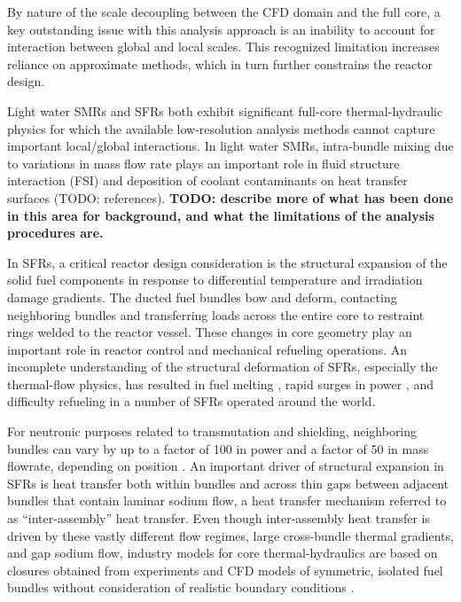 By nature of the scale decoupling between the CFD domain and the full core, a key outstanding issue with this analysis approach is an inability to account for interaction between global and local scales. This recognized limitation increases reliance on approximate methods, which in turn further constrains the reactor design.

Light water SMRs and SFRs both exhibit significant full-core thermal-hydraulic physics for which the available low-resolution analysis methods cannot capture important local/global interactions. In light water SMRs, intra-bundle mixing due to variations in mass flow rate plays an important role in fluid structure interaction (FSI) and deposition of coolant contaminants on heat transfer surfaces (TODO: references). {\bf TODO: describe more of what has been done in this area for background, and what the limitations of the analysis procedures are.}

In SFRs, a critical reactor design consideration is the structural expansion of the solid fuel components in response to differential temperature and irradiation damage gradients. The ducted fuel bundles bow and deform, contacting neighboring bundles and transferring loads across the entire core to restraint rings welded to the reactor vessel. These changes in core geometry play an important role in reactor control and mechanical refueling operations. An incomplete understanding of the structural deformation of SFRs, especially the thermal-flow physics, has resulted in fuel melting \cite{brittan}, rapid surges in power \cite{chaumont}, and difficulty refueling \cite{shields} in a number of SFRs operated around the world.

For neutronic purposes related to transmutation and shielding, neighboring bundles can vary by up to a factor of 100 in power and a factor of 50 in mass flowrate, depending on position \cite{abr}. An important driver of structural expansion in SFRs is heat transfer both within bundles and across thin gaps between adjacent bundles that contain laminar sodium flow, a heat transfer mechanism referred to as ``inter-assembly'' heat transfer. Even though inter-assembly heat transfer is driven by these vastly different flow regimes, large cross-bundle thermal gradients, and gap sodium flow, industry models for core thermal-hydraulics are based on closures obtained from experiments and CFD models of symmetric, isolated fuel bundles without consideration of realistic boundary conditions \cite{touran}. 

